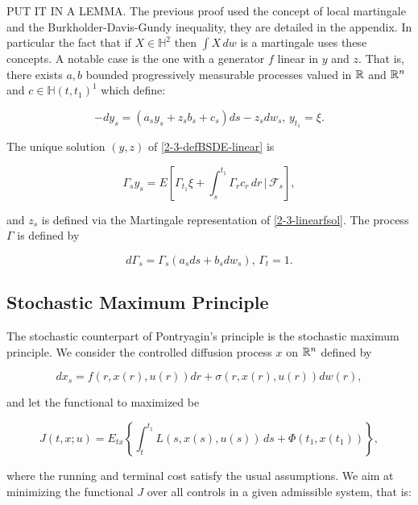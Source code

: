 {\color{red}{}
PUT IT IN A LEMMA. The previous proof used the concept of local martingale and the Burkholder-Davis-Gundy inequality, they are detailed in the appendix. In particular the fact that if $X\in\mathbb{H}^2$ then $\int X\,dw$ is a martingale uses these concepts.
}
A notable case is the one with a generator $f$ linear in $y$ and $z$. That is, there exists 
$a,b$ bounded progressively measurable processes valued in $\mathbb{R}$ and $\mathbb{R}^n$ and $c\in\mathbb{H}(t,t_1)^1$ which define:

\begin{equation}\label{2-3-defBSDE-linear}-dy_s = \left(a_sy_s + z_sb_s + c_s\right)ds - z_sdw_s,\,y_{t_1}=\xi.\end{equation}

\begin{proposition}
    The unique solution $(y,z)$ of \eqref{2-3-defBSDE-linear} is
    
    \begin{equation}\label{2-3-linearfsol}
        \Gamma_sy_s = E\left[\Gamma_{t_1}\xi + \int_s^{t_1} \Gamma_rc_r\,dr\,|\,\mathcal{F}_s\right],
    \end{equation}

    and $z_s$ is defined via the Martingale representation of \eqref{2-3-linearfsol}. The process $\Gamma$ is defined by

    \[d\Gamma_s = \Gamma_s\left(a_sds + b_sdw_s\right),\,\Gamma_t=1.\]
\end{proposition}

\subsection{Stochastic Maximum Principle}

The stochastic counterpart of Pontryagin's principle is the stochastic maximum principle. We consider the controlled diffusion process $x$ on $\mathbb{R}^n$ defined by

\begin{equation}
    dx_s = f(r,x(r),u(r))dr + \sigma(r,x(r),u(r))dw(r),
\end{equation}

and let the functional to maximized be

\begin{equation}\label{2-3-newfunctmax}
    J(t,x;u) = E_{tx}\left\{\int_t^{t_1}L(s,x(s),u(s))\,ds + \Phi(t_1,x(t_1))\right\},
\end{equation}

where the running and terminal cost satisfy the usual assumptions. We aim at minimizing the functional $J$ over all 
controls in a given admissible system, that is:

